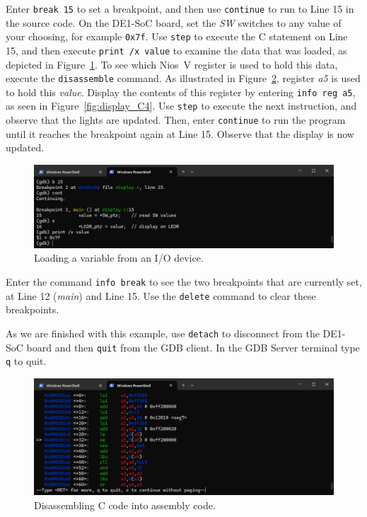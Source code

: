 \documentclass[11pt, twoside, pdftex]{article}
\newcommand{\red}[1]{{\color{red}\sf{#1}}}
\begin{document}
Enter \texttt{break 15} to set a breakpoint, and then use \texttt{continue} to run to 
Line 15 in the source code. On the DE1-SoC board, set the {\it SW} switches to any value of
your choosing, for example \texttt{0x7f}. Use \texttt{step} to execute the C statement on
Line 15, and then execute \texttt{print /x value} to examine the data that was loaded, as 
depicted in Figure~\ref{fig:display_C2}. To see which Nios~V register is used to hold
this data, execute the \texttt{disassemble} command. As illustrated in 
Figure~\ref{fig:display_C3}, register {\it a5} is used to hold this {\it value}. Display
the contents of this register by entering \texttt{info reg a5}, as seen in 
Figure~\ref{fig:display_C4}. Use \texttt{step} to execute the next instruction, and
observe that the \red{{\it LEDR}} lights are updated. Then, enter \texttt{continue} to run
the program until it reaches the breakpoint again at Line 15. Observe that the 
\red{{\it HEX0}} display is now updated.
~\\
\begin{figure}[H]
    \begin{center}
        \includegraphics[scale=.6]{figures/display_C2.png}
        \caption{Loading a variable from an I/O device.}
        \label{fig:display_C2}
    \end{center}
\end{figure}

Enter the command \texttt{info break} to see the two breakpoints that are currently set,
at Line 12 ({\it main}) and Line 15. Use the \texttt{delete} command to clear these
breakpoints. 

As we are finished with this example, use \texttt{detach} to disconnect from the DE1-SoC 
board and then \texttt{quit} from the GDB client. In the GDB Server terminal type 
\texttt{q} to quit.

\begin{figure}[H]
    \begin{center}
        \includegraphics[scale=.6]{figures/display_C3.png}
        \caption{Disassembling C code into assembly code.}
        \label{fig:display_C3}
    \end{center}
\end{figure}
\end{document}
